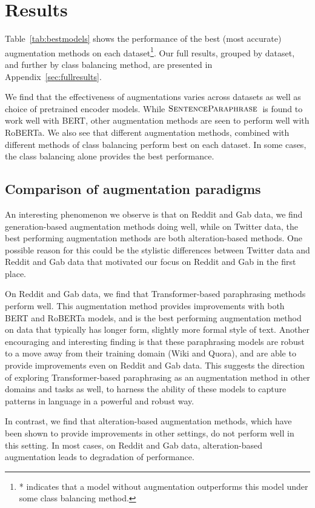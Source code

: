 \documentclass[11pt,a4paper]{article}
\newcommand{\senttfpara}{$\textsc{SentenceParaphrase}$}
\begin{document}
\section{Results}

Table~\ref{tab:bestmodels} shows the performance of the best (most accurate) augmentation methods on each dataset\footnote{* indicates that a model without augmentation outperforms this model under some class balancing method.}. Our full results, grouped by dataset, and further by class balancing method, are presented in Appendix~\ref{sec:fullresults}. 

We find that the effectiveness of augmentations varies across datasets as well as choice of pretrained encoder models. While \senttfpara\ is found to work well with BERT, other augmentation methods are seen to perform well with RoBERTa. We also see that different augmentation methods, combined with different methods of class balancing perform best on each dataset. In some cases, the class balancing alone provides the best performance.

\subsection{Comparison of augmentation paradigms}
An interesting phenomenon we observe is that on Reddit and Gab data, we find generation-based augmentation methods doing well, while on Twitter data, the best performing augmentation methods are both alteration-based methods. One possible reason for this could be the stylistic differences between Twitter data and Reddit and Gab data that motivated our focus on Reddit and Gab in the first place.

On Reddit and Gab data, we find that Transformer-based paraphrasing methods perform well. This augmentation method provides improvements with both BERT and RoBERTa models, and is the best performing augmentation method on data that typically has longer form, slightly more formal style of text. Another encouraging and interesting finding is that these paraphrasing models are robust to a move away from their training domain (Wiki and Quora), and are able to provide improvements even on Reddit and Gab data. This suggests the direction of exploring Transformer-based paraphrasing as an augmentation method in other domains and tasks as well, to harness the ability of these models to capture patterns in language in a powerful and robust way.

In contrast, we find that alteration-based augmentation methods, which have been shown to provide improvements in other settings, do not perform well in this setting. In most cases, on Reddit and Gab data, alteration-based augmentation leads to degradation of performance. 
\end{document}
